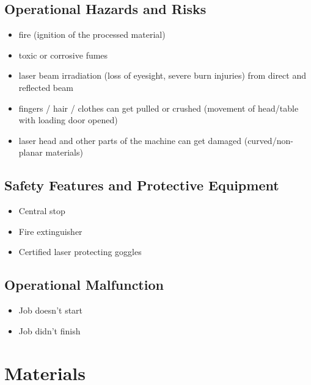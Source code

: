 \documentclass[fleqn]{article}
\begin{document}
\subsection{Operational Hazards and Risks}
	\begin{itemize}[noitemsep,topsep=0pt]
	
		\item fire (ignition of the processed material)
		\item toxic or corrosive fumes
		\item laser beam irradiation (loss of eyesight, severe burn injuries) from direct and reflected beam
		\item fingers / hair / clothes can get pulled or crushed (movement of head/table with loading door opened)
		\item laser head and other parts of the machine can get damaged (curved/non-planar materials)
	
	\end{itemize}

\begin{multicols}{2}\setlength{\parindent}{1em}
	\subsection{Safety Features and Protective Equipment}
	\begin{itemize}[noitemsep,topsep=0pt]
		
		\item Central stop
		\item Fire extinguisher
		\item Certified laser protecting goggles
		
	\end{itemize}
	\columnbreak
	
	\subsection{Operational Malfunction}
	\begin{itemize}[noitemsep,topsep=0pt]
		
		\item Job doesn't start
		\item Job didn't finish
		
	\end{itemize}
		\columnbreak
	
\end{multicols}



\clearpage
\section{Materials}
\end{document}
